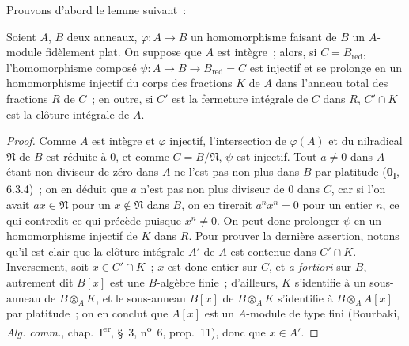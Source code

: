 Prouvons d'abord le lemme suivant~:

\begin{lemma}[23.2.7.1]
\label{0.23.2.7.1-fr}
Soient $A$, $B$ deux anneaux, $\varphi:A\to B$ un homomorphisme faisant de $B$
un $A$-module fidèlement plat. On suppose que $A$ est intègre~; alors, si
$C=B_{\mathrm{red}}$, l'homomorphisme composé
$\psi:A\to B\to B_{\mathrm{red}}=C$ est injectif et se prolonge en un
homomorphisme injectif du corps des fractions $K$ de $A$ dans l'anneau total
des fractions $R$ de $C$~; en outre, si $C'$ est la fermeture intégrale de
$C$ dans $R$, $C'\cap K$ est la clôture intégrale de $A$.
\end{lemma}

\begin{proof}
Comme $A$ est intègre et $\varphi$ injectif, l'intersection de $\varphi(A)$
et du nilradical $\mathfrak N$ de $B$ est réduite à $0$, et comme
$C=B/\mathfrak N$, $\psi$ est injectif. Tout $a\neq0$ dans $A$ étant non
diviseur de zéro dans $A$ ne l'est pas non plus dans $B$ par platitude
(\textbf{0}\textsubscript{I}, 6.3.4)~; on en déduit que $a$ n'est pas non plus diviseur
de $0$ dans $C$, car si l'on avait $ax\in\mathfrak N$ pour un
$x\notin\mathfrak N$ dans $B$, on en tirerait $a^nx^n=0$ pour un entier $n$,
ce qui contredit ce qui précède puisque $x^n\neq0$. On peut donc prolonger
$\psi$ en un homomorphisme injectif de $K$ dans $R$. Pour prouver la dernière
assertion, notons qu'il est clair que la clôture intégrale $A'$ de $A$ est
contenue dans $C'\cap K$. Inversement, soit $x\in C'\cap K$~; $x$ est donc
entier sur $C$, et \emph{a fortiori} sur $B$, autrement dit $B[x]$ est une
$B$-algèbre finie~; d'ailleurs, $K$ s'identifie à un sous-anneau de
$B\otimes_AK$, et le sous-anneau $B[x]$ de $B\otimes_AK$ s'identifie à
$B\otimes_AA[x]$ par platitude~; on en conclut que $A[x]$ est un $A$-module
de type fini (Bourbaki, \emph{Alg. comm.}, chap.~I\textsuperscript{er}, §~3,
n\textsuperscript{o}~6, prop.~11), donc que $x\in A'$.
\end{proof}

